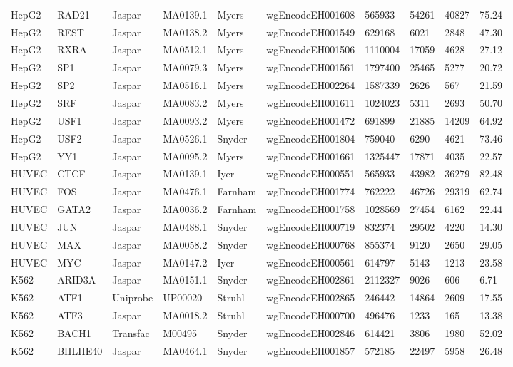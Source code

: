 {\begin{longtable}{p{1.1cm}p{1.0cm}p{1.0cm}p{1.0cm}p{1.0cm}p{2.3cm}p{1.0cm}p{0.8cm}p{0.8cm}p{0.8cm}}
HepG2 & RAD21 & Jaspar & MA0139.1 & Myers & wgEncodeEH001608 & 565933 & 54261 & 40827 & 75.24\\
HepG2 & REST & Jaspar & MA0138.2 & Myers & wgEncodeEH001549 & 629168 & 6021 & 2848 & 47.30\\
HepG2 & RXRA & Jaspar & MA0512.1 & Myers & wgEncodeEH001506 & 1110004 & 17059 & 4628 & 27.12\\
HepG2 & SP1 & Jaspar & MA0079.3 & Myers & wgEncodeEH001561 & 1797400 & 25465 & 5277 & 20.72\\
HepG2 & SP2 & Jaspar & MA0516.1 & Myers & wgEncodeEH002264 & 1587339 & 2626 & 567 & 21.59\\
HepG2 & SRF & Jaspar & MA0083.2 & Myers & wgEncodeEH001611 & 1024023 & 5311 & 2693 & 50.70\\
HepG2 & USF1 & Jaspar & MA0093.2 & Myers & wgEncodeEH001472 & 691899 & 21885 & 14209 & 64.92\\
HepG2 & USF2 & Jaspar & MA0526.1 & Snyder & wgEncodeEH001804 & 759040 & 6290 & 4621 & 73.46\\
HepG2 & YY1 & Jaspar & MA0095.2 & Myers & wgEncodeEH001661 & 1325447 & 17871 & 4035 & 22.57\\
HUVEC & CTCF & Jaspar & MA0139.1 & Iyer & wgEncodeEH000551 & 565933 & 43982 & 36279 & 82.48\\
HUVEC & FOS & Jaspar & MA0476.1 & Farnham & wgEncodeEH001774 & 762222 & 46726 & 29319 & 62.74\\
HUVEC & GATA2 & Jaspar & MA0036.2 & Farnham & wgEncodeEH001758 & 1028569 & 27454 & 6162 & 22.44\\
HUVEC & JUN & Jaspar & MA0488.1 & Snyder & wgEncodeEH000719 & 832374 & 29502 & 4220 & 14.30\\
HUVEC & MAX & Jaspar & MA0058.2 & Snyder & wgEncodeEH000768 & 855374 & 9120 & 2650 & 29.05\\
HUVEC & MYC & Jaspar & MA0147.2 & Iyer & wgEncodeEH000561 & 614797 & 5143 & 1213 & 23.58\\
K562 & ARID3A & Jaspar & MA0151.1 & Snyder & wgEncodeEH002861 & 2112327 & 9026 & 606 & 6.71\\
K562 & ATF1 & Uniprobe & UP00020 & Struhl & wgEncodeEH002865 & 246442 & 14864 & 2609 & 17.55\\
K562 & ATF3 & Jaspar & MA0018.2 & Struhl & wgEncodeEH000700 & 496476 & 1233 & 165 & 13.38\\
K562 & BACH1 & Transfac & M00495 & Snyder & wgEncodeEH002846 & 614421 & 3806 & 1980 & 52.02\\
K562 & BHLHE40 & Jaspar & MA0464.1 & Snyder & wgEncodeEH001857 & 572185 & 22497 & 5958 & 26.48\\

\end{longtable}}
